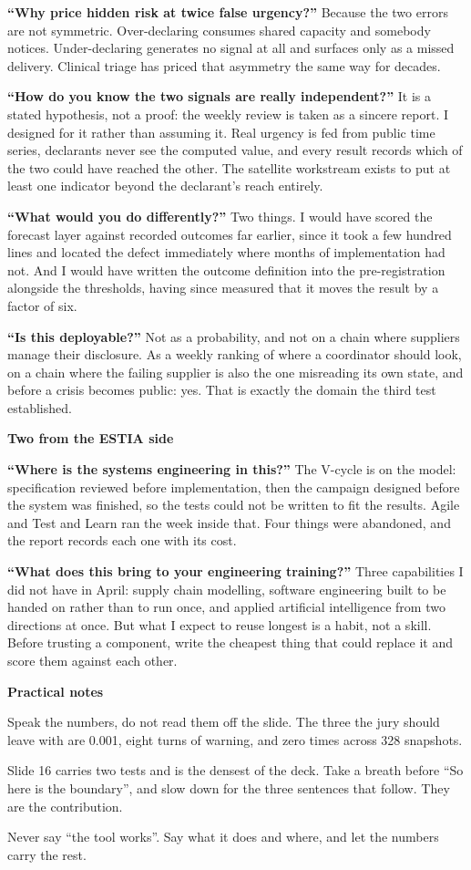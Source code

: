 \documentclass[a4paper,12pt]{article}
\newcommand{\SubHeading}[1]{%
  \needspace{3\baselineskip}%
  \vspace{10pt}%
  {\noindent\large\bfseries\color{altenAzureDark}#1\par}%
  \vspace{2pt}\par}
\begin{document}
\textbf{``Why price hidden risk at twice false urgency?''} Because the two errors are not symmetric. Over-declaring consumes shared capacity and somebody notices. Under-declaring generates no signal at all and surfaces only as a missed delivery. Clinical triage has priced that asymmetry the same way for decades.

\textbf{``How do you know the two signals are really independent?''} It is a stated hypothesis, not a proof: the weekly review is taken as a sincere report. I designed for it rather than assuming it. Real urgency is fed from public time series, declarants never see the computed value, and every result records which of the two could have reached the other. The satellite workstream exists to put at least one indicator beyond the declarant's reach entirely.

\textbf{``What would you do differently?''} Two things. I would have scored the forecast layer against recorded outcomes far earlier, since it took a few hundred lines and located the defect immediately where months of implementation had not. And I would have written the outcome definition into the pre-registration alongside the thresholds, having since measured that it moves the result by a factor of six.

\textbf{``Is this deployable?''} Not as a probability, and not on a chain where suppliers manage their disclosure. As a weekly ranking of where a coordinator should look, on a chain where the failing supplier is also the one misreading its own state, and before a crisis becomes public: yes. That is exactly the domain the third test established.

\SubHeading{Two from the ESTIA side}
\textbf{``Where is the systems engineering in this?''} The V-cycle is on the model: specification reviewed before implementation, then the campaign designed before the system was finished, so the tests could not be written to fit the results. Agile and Test and Learn ran the week inside that. Four things were abandoned, and the report records each one with its cost.

\textbf{``What does this bring to your engineering training?''} Three capabilities I did not have in April: supply chain modelling, software engineering built to be handed on rather than to run once, and applied artificial intelligence from two directions at once. But what I expect to reuse longest is a habit, not a skill. Before trusting a component, write the cheapest thing that could replace it and score them against each other.

\SubHeading{Practical notes}
Speak the numbers, do not read them off the slide. The three the jury should leave with are 0.001, eight turns of warning, and zero times across 328 snapshots.

Slide 16 carries two tests and is the densest of the deck. Take a breath before ``So here is the boundary'', and slow down for the three sentences that follow. They are the contribution.

Never say ``the tool works''. Say what it does and where, and let the numbers carry the rest.
\end{document}
